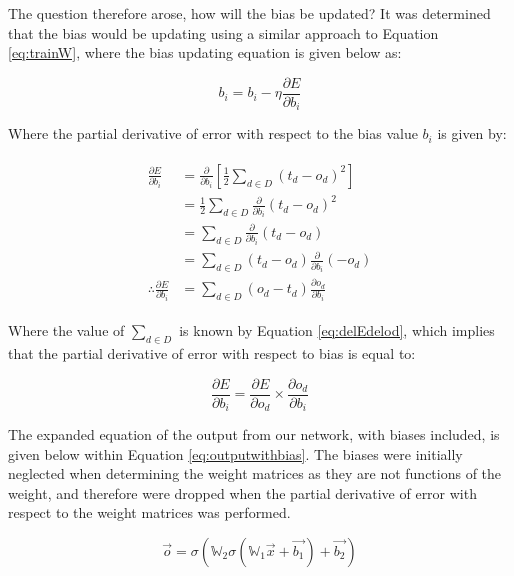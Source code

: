 \documentclass[a4paper]{article}
\begin{document}
The question therefore arose, how will the bias be updated? It was determined that the bias would be updating using a similar approach to Equation \ref{eq:trainW}, where the bias updating equation is given below as:

\begin{equation}
    \label{eq:trainBias}
    b_i = b_i - \eta \frac{\partial{E}}{\partial{b_i}}
\end{equation}

Where the partial derivative of error with respect to the bias value $b_i$ is given by:

\begin{gather}
    \begin{aligned}
        \label{eq:biasderivation}
        \frac{\partial{E}}{\partial{b_i}} &= \frac{\partial}{\partial{b_i}}\left[ \frac{1}{2} \sum_{d \in D}(t_d - o_d)^2 \right] \\
        &= \frac{1}{2}\sum_{d \in D} \frac{\partial}{\partial{b_i}}(t_d - o_d)^2 \\
        &= \sum_{d \in D}\frac{\partial}{\partial{b_i}}(t_d - o_d) \\
        &= \sum_{d \in D}(t_d - o_d)\frac{\partial}{\partial{b_i}}(-o_d) \\
        \therefore \frac{\partial{E}}{\partial{b_i}} &= \sum_{d \in D}(o_d - t_d)\frac{\partial{o_d}}{\partial{b_i}}
    \end{aligned}
\end{gather}

Where the value of $\sum_{d \in D}$ is known by Equation \ref{eq:delEdelod}, which implies that the partial derivative of error with respect to bias is equal to:

\begin{equation}
    \label{eq:delEdelbias}
    \frac{\partial{E}}{\partial{b_i}} = \frac{\partial{E}}{\partial{o_d}} \times \frac{\partial{o_d}}{\partial{b_i}}
\end{equation}

The expanded equation of the output from our network, with biases included, is given below within Equation \ref{eq:outputwithbias}. The biases were initially neglected when determining the weight matrices as they are not functions of the weight, and therefore were dropped when the partial derivative of error with respect to the weight matrices was performed. 

\begin{equation}
    \label{eq:outputwithbias}
    \overrightarrow{o} = \sigma(\mathbb W_2 \sigma(\mathbb W_1 \overrightarrow{x} + \overrightarrow{b_1}) + \overrightarrow{b_2})
\end{equation}
\end{document}
